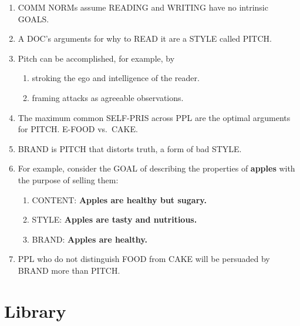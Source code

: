 \documentclass[
]{book}
\providecommand{\tightlist}{%
  \setlength{\itemsep}{0pt}\setlength{\parskip}{0pt}}
\begin{document}
\begin{enumerate}
\def\labelenumi{\arabic{enumi}.}
\setcounter{enumi}{33}
\tightlist
\item
  COMM NORMs assume READING and WRITING have no intrinsic GOALS.
\item
  A DOC's arguments for why to READ it are a STYLE called PITCH.
\item
  Pitch can be accomplished, for example, by

  \begin{enumerate}
  \def\labelenumii{\arabic{enumii}.}
  \tightlist
  \item
    stroking the ego and intelligence of the reader.
  \item
    framing attacks as agreeable observations.
  \end{enumerate}
\item
  The maximum common SELF-PRIS across PPL are the optimal arguments
  for PITCH. E-FOOD vs.~CAKE.
\item
  BRAND is PITCH that distorts truth, a form of bad STYLE.
\item
  For example, consider the GOAL of describing the properties of
  \textbf{apples} with the purpose of selling them:

  \begin{enumerate}
  \def\labelenumii{\arabic{enumii}.}
  \tightlist
  \item
    CONTENT: \textbf{Apples are healthy but sugary.}\\
  \item
    STYLE: \textbf{Apples are tasty and nutritious.}\\
  \item
    BRAND: \textbf{Apples are healthy.}\\
  \end{enumerate}
\item
  PPL who do not distinguish FOOD from CAKE will be persuaded by BRAND
  more than PITCH.
\end{enumerate}

\hypertarget{library}{%
\section{Library}\label{library}}
\end{document}
